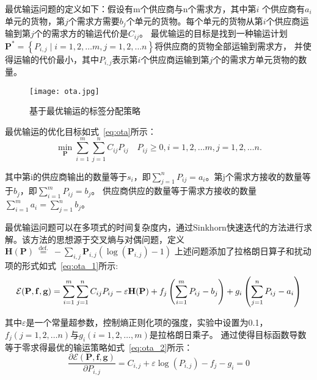 最优输运问题的定义如下：假设有m个供应商与n个需求方，其中第$i$
个供应商有$a_i$单元的货物，第$j$个需求方需要$b_j$个单元的货物。每个单元的货物从第$i$个供应商运输到第$j$个的需求方的输运代价是$C_{ij}$。
最优输运的目标是找到一种输运计划$\mathbf{P}^{*}=\left\{P_{i, j} \mid i=1,2, \ldots m, j=1,2, \ldots n\right\}$将供应商的货物全部运输到需求方，
并使得运输的代价最小，其中$P_{i, j}$表示第$i$个供应商运输到第$j$个的需求方单元货物的数量。

\begin{figure}[htbp]                     
  \centering                      
  \texttt{[image: ota.jpg]}                      
  \caption{基于最优输运的标签分配策略}                      
  \label{fig:ota}       
\end{figure}  

最优输运的优化目标如式~\ref{eq:ota}所示：
\begin{equation}   
  \min _{\mathbf{P}} \sum_{i=1}^{m} \sum_{j=1}^{n} C_{i j} P_{i j} \quad P_{i j} \geq 0,i=1,2, \ldots m, j=1,2, \ldots n .
  \label{eq:ota} 
\end{equation}

其中第i的供应商输出的数量等于$s_i$，即$ \sum_{j=1}^{n} P_{i j}=a_{i}$。第j个需求方接收的数量等于$b_j$，即$\sum_{i=1}^{m} P_{i j}=b_{j}$。
供应商供应的数量等于需求方接收的数量$\sum_{i=1}^{m} a_{i}=\sum_{j=1}^{n} b_{j}$。

最优输运问题可以在多项式的时间复杂度内，通过Sinkhorn快速迭代的方法进行求解。该方法的思想源于交叉熵与对偶问题，定义$\mathbf{H}(\mathbf{P}) \stackrel{\text { def. }}{=} -\sum_{i, j} \mathbf{P}_{i, j}\left(\log \left(\mathbf{P}_{i, j}\right)-1\right)$
上述问题添加了拉格朗日算子和扰动项的形式如式~\ref{eq:ota_1}所示:
\begin{equation}   
  {\cal E}({\bf{P}},{\bf{f}},{\bf{g}}) = \sum\limits_{i = 1}^m {\sum\limits_{j = 1}^n {{{C}_{ij}}} } {{P}_{ij}} - \varepsilon {\bf{H}}({\bf{P}}) + {f_j}\left( {\sum\limits_{i = 1}^m {P_{ij}}  - {b_j}} \right) + {g_i}\left( {\sum\limits_{j = 1}^n {P_{ij}}  - {a_i}} \right)
  \label{eq:ota_1} 
\end{equation}

其中$\varepsilon$是一个常量超参数，控制熵正则化项的强度，实验中设置为0.1，$f_{j}(j=1,2, \ldots n)$与$g_{i}(i=1,2, \ldots, m)$是拉格朗日乘子。
通过使得目标函数导数等于零求得最优的输运策略如式~\ref{eq:ota_2}所示：
\begin{equation}   
  \frac{\partial \mathcal{E}(\mathbf{P}, \mathbf{f}, \mathbf{g})}{\partial P_{i, j}}=C_{i, j}+\varepsilon \log \left(P_{i, j}\right)-f_{j}-g_{i}=0
  \label{eq:ota_2} 
\end{equation}

